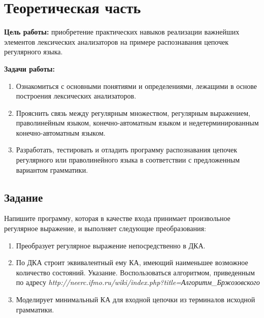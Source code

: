\chapter{Теоретическая часть}

\textbf{Цель работы:} приобретение практических навыков реализации важнейших элементов лексических анализаторов на примере распознавания цепочек регулярного языка.

\textbf{Задачи работы:}

\begin{enumerate}
	\item Ознакомиться с основными понятиями и определениями, лежащими в основе построения лексических анализаторов.
	\item Прояснить связь между регулярным множеством, регулярным выражением, праволинейным языком, конечно-автоматным языком и недетерминированным конечно-автоматным языком.
	\item Разработать, тестировать и отладить программу распознавания цепочек регулярного или праволинейного языка в соответствии с предложенным вариантом грамматики.
\end{enumerate}

\section{Задание}

Напишите программу, которая в качестве входа принимает произвольное регулярное выражение, и выполняет следующие преобразования:

\begin{enumerate}
	\item Преобразует регулярное выражение непосредственно в ДКА.
	\item По ДКА строит эквивалентный ему КА, имеющий наименьшее возможное количество состояний. Указание. Воспользоваться алгоритмом, приведенным по адресу \textit{http://neerc.ifmo.ru/wiki/index.php?title=Алгоритм\_Бржозовского}
	\item Моделирует минимальный КА для входной цепочки из терминалов исходной грамматики.
\end{enumerate}



   
